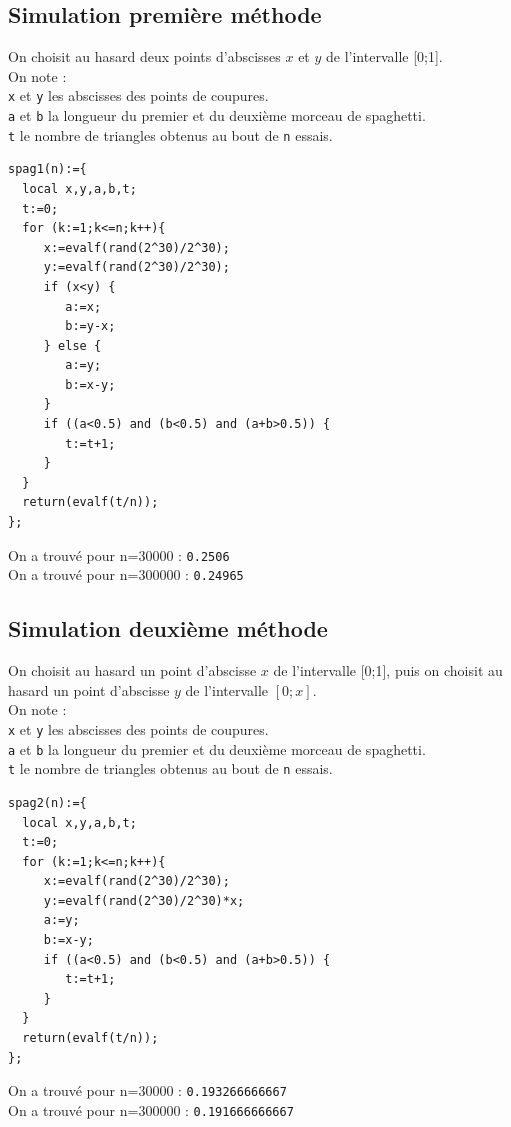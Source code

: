 \documentclass[a4paper,11pt]{book}
\begin{document}
\subsection{Simulation premi\`ere m\'ethode}
On choisit au hasard deux points d'abscisses $x$ et $y$ de l'intervalle [0;1].\\
On note :\\
{\tt x} et {\tt y} les abscisses des points de coupures.\\
{\tt a} et {\tt b} la longueur du premier et du deuxi\`eme morceau 
de spaghetti.\\
{\tt t} le nombre de triangles obtenus au bout de {\tt n} essais.
\begin{verbatim}
spag1(n):={
  local x,y,a,b,t;
  t:=0;
  for (k:=1;k<=n;k++){
     x:=evalf(rand(2^30)/2^30);
     y:=evalf(rand(2^30)/2^30);
     if (x<y) {
        a:=x;
        b:=y-x;
     } else {
        a:=y;
        b:=x-y;
     }
     if ((a<0.5) and (b<0.5) and (a+b>0.5)) {
        t:=t+1;
     }
  }
  return(evalf(t/n));
}; 
\end{verbatim} 
On a trouv\'e pour n=30000 :
{\tt 0.2506}\\ 
On a trouv\'e pour n=300000 :
{\tt 0.24965}
\subsection{Simulation deuxi\`eme m\'ethode}
On choisit au hasard un point d'abscisse $x$ de l'intervalle [0;1], puis
on choisit au hasard un point d'abscisse $y$ de l'intervalle $[0;x]$.\\
On note :\\
{\tt x} et {\tt y} les abscisses des points de coupures.\\
{\tt a} et {\tt b} la longueur du premier et du deuxi\`eme morceau 
de spaghetti.\\
{\tt t} le nombre de triangles obtenus au bout de {\tt n} essais.
\begin{verbatim}
spag2(n):={
  local x,y,a,b,t;
  t:=0;
  for (k:=1;k<=n;k++){
     x:=evalf(rand(2^30)/2^30);
     y:=evalf(rand(2^30)/2^30)*x;
     a:=y;
     b:=x-y;
     if ((a<0.5) and (b<0.5) and (a+b>0.5)) {
        t:=t+1;
     }
  }
  return(evalf(t/n));
}; 
\end{verbatim}
On a trouv\'e pour n=30000 :
{\tt 0.193266666667}\\
On a trouv\'e pour n=300000 :
{\tt 0.191666666667}
\end{document}

